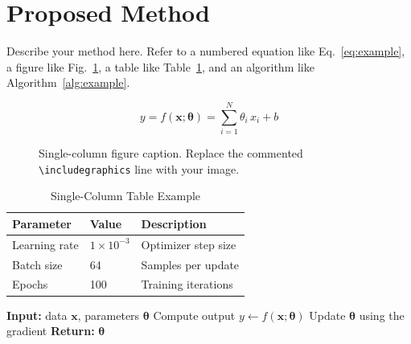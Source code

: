 \section{Proposed Method}
\label{sec:method}

Describe your method here. Refer to a numbered equation like
Eq.~\eqref{eq:example}, a figure like Fig.~\ref{fig:example}, a table like
Table~\ref{tab:example}, and an algorithm like Algorithm~\ref{alg:example}.

\begin{equation}
y = f(\mathbf{x};\boldsymbol{\theta}) = \sum_{i=1}^{N} \theta_i\,x_i + b
\label{eq:example}
\end{equation}

\begin{figure}[!t]
\centering
\caption{Single-column figure caption. Replace the commented
\texttt{\textbackslash includegraphics} line with your image.}
\label{fig:example}
\end{figure}

\begin{table}[!t]
\caption{Single-Column Table Example}
\label{tab:example}
\setlength{\tabcolsep}{4pt}
\begin{tabular*}{\columnwidth}{@{\extracolsep{\fill}}lll@{}}
\hline
\textbf{Parameter} & \textbf{Value} & \textbf{Description} \\
\hline
Learning rate & $1\times10^{-3}$ & Optimizer step size \\
Batch size    & 64               & Samples per update \\
Epochs        & 100              & Training iterations \\
\hline
\end{tabular*}
\end{table}

\begin{algorithm}
\caption{Example Procedure}
\label{alg:example}
\begin{algorithmic}[1]
\STATE \textbf{Input:} data $\mathbf{x}$, parameters $\boldsymbol{\theta}$
  \STATE Compute output $y \leftarrow f(\mathbf{x};\boldsymbol{\theta})$
  \STATE Update $\boldsymbol{\theta}$ using the gradient
\ENDFOR
\STATE \textbf{Return:} $\boldsymbol{\theta}$
\end{algorithmic}
\end{algorithm}

